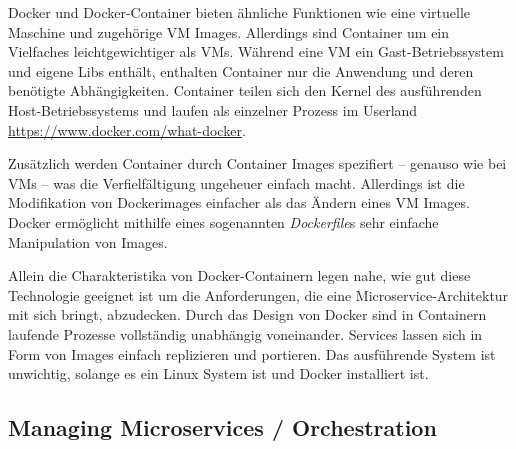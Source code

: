 Docker und Docker-Container bieten ähnliche Funktionen wie eine virtuelle Maschine und zugehörige VM Images. Allerdings sind Container um ein Vielfaches leichtgewichtiger als VMs. Während eine VM ein Gast-Betriebssystem und eigene Libs enthält, enthalten Container nur die Anwendung und deren benötigte Abhängigkeiten. Container teilen sich den Kernel des ausführenden Host-Betriebssystems und laufen als einzelner Prozess im Userland \url{https://www.docker.com/what-docker}. 

Zusätzlich werden Container durch Container Images spezifiert -- genauso wie bei VMs -- was die Verfielfältigung ungeheuer einfach macht. Allerdings ist die Modifikation von Dockerimages einfacher als das Ändern eines VM Images. Docker ermöglicht mithilfe eines sogenannten \textit{Dockerfile}s sehr einfache Manipulation von Images.

Allein die Charakteristika von Docker-Containern legen nahe, wie gut diese Technologie geeignet ist um die Anforderungen, die eine Microservice-Architektur mit sich bringt, abzudecken. Durch das Design von Docker sind in Containern laufende Prozesse vollständig unabhängig voneinander. Services lassen sich in Form von Images einfach replizieren und portieren. Das ausführende System ist unwichtig, solange es ein Linux System ist und Docker installiert ist. 
\subsection{Managing Microservices / \glqq Orchestration\grqq}